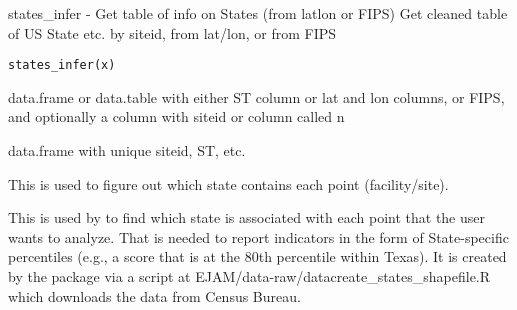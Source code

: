 \documentclass[a4paper]{book}
\begin{document}
%
\begin{Description}\relax
states\_infer - Get table of info on States (from latlon or FIPS)
Get cleaned table of US State etc. by siteid, from lat/lon, or from FIPS
\end{Description}
%
\begin{Usage}
\begin{verbatim}
states_infer(x)
\end{verbatim}
\end{Usage}
%
\begin{Arguments}
\begin{ldescription}
\item[\code{x}] data.frame or data.table with either ST column or lat and lon columns, or FIPS,
and optionally a column with siteid or column called n
\end{ldescription}
\end{Arguments}
%
\begin{Value}
data.frame with unique siteid, ST, etc.
\end{Value}
%
\begin{SeeAlso}\relax
{} 
\end{SeeAlso}
%
\begin{Description}\relax
This is used to figure out which state contains each point (facility/site).
\end{Description}
%
\begin{Details}\relax
This is used by  to find which state is associated with each point
that the user wants to analyze. That is needed to report indicators in
the form of State-specific percentiles
(e.g., a score that is at the 80th percentile within Texas).
It is created by the package via a script at EJAM/data-raw/datacreate\_states\_shapefile.R
which downloads the data from Census Bureau.
\end{Details}
%
\begin{SeeAlso}\relax
{} 
\end{SeeAlso}
\end{document}
